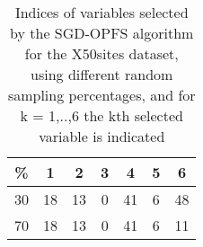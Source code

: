 \begin{table}
	\begin{center}
		\begin{tabular}{c c c c c c c}
			\% & 1 & 2 & 3 & 4 & 5 & 6 \\
			\hline
			30 & 18 & 13 & 0 & 41 & 6 & 48 \\
			70 & 18 & 13 & 0 & 41 & 6 & 11 \\
		\end{tabular}
	\end{center}
	\caption{Indices of variables selected by the SGD-OPFS algorithm for the X50sites dataset, using different random sampling percentages, and for k = 1,..,6 the kth selected variable is indicated}
\end{table}
